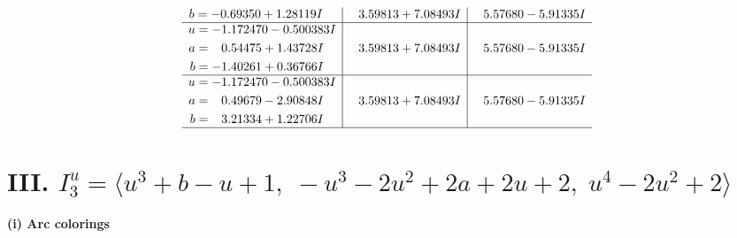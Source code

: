 \documentclass[1p]{elsarticle_modified}
\theoremstyle{definition}
\begin{document}
$$\begin{array}{c|c|c}
\begin{aligned}
b &= -0.69350 + 1.28119 I\end{aligned}
 & \phantom{-}3.59813 + 7.08493 I & \phantom{-}5.57680 - 5.91335 I \\ \hline\begin{aligned}
u &= -1.172470 - 0.500383 I \\
a &= \phantom{-}0.54475 + 1.43728 I \\
b &= -1.40261 + 0.36766 I\end{aligned}
 & \phantom{-}3.59813 + 7.08493 I & \phantom{-}5.57680 - 5.91335 I \\ \hline\begin{aligned}
u &= -1.172470 - 0.500383 I \\
a &= \phantom{-}0.49679 - 2.90848 I \\
b &= \phantom{-}3.21334 + 1.22706 I\end{aligned}
 & \phantom{-}3.59813 + 7.08493 I & \phantom{-}5.57680 - 5.91335 I\\
 \hline 
 \end{array}$$\newpage\newpage\renewcommand{\arraystretch}{1}
\centering \section*{III. $I^u_{3}= \langle u^3+b- u+1,\;- u^3-2 u^2+2 a+2 u+2,\;u^4-2 u^2+2 \rangle$}
\flushleft \textbf{(i) Arc colorings}\\
\end{document}
